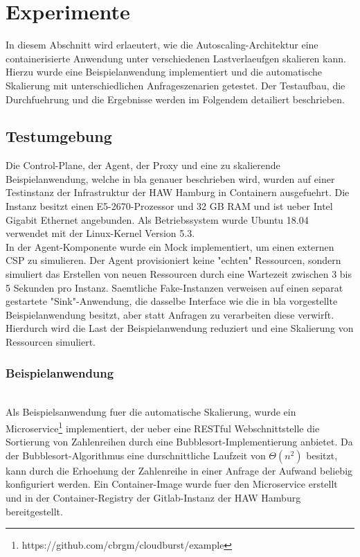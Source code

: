 \documentclass[runningheads]{llncs}
\begin{document}

\section{Experimente}

In diesem Abschnitt wird erlaeutert, wie die Autoscaling-Architektur eine containerisierte Anwendung unter verschiedenen Lastverlaeufgen skalieren kann. Hierzu wurde eine Beispielanwendung implementiert und die automatische Skalierung mit unterschiedlichen Anfrageszenarien getestet. Der Testaufbau, die Durchfuehrung und die Ergebnisse werden im Folgendem detailiert beschrieben.

\subsection{Testumgebung}

Die Control-Plane, der Agent, der Proxy und eine zu skalierende Beispielanwendung, welche in bla genauer beschrieben wird, wurden auf einer Testinstanz der Infrastruktur der HAW Hamburg in Containern ausgefuehrt. Die Instanz besitzt einen E5-2670-Prozessor und 32 GB RAM und ist ueber Intel Gigabit Ethernet angebunden. Als Betriebssystem wurde Ubuntu 18.04 verwendet mit der Linux-Kernel Version 5.3. \\

In der Agent-Komponente wurde ein Mock implementiert, um einen externen CSP zu simulieren. Der Agent provisioniert keine "echten" Ressourcen, sondern simuliert das Erstellen von neuen Ressourcen durch eine Wartezeit zwischen 3 bis 5 Sekunden pro Instanz. Saemtliche Fake-Instanzen verweisen auf einen separat gestartete "Sink"-Anwendung, die dasselbe Interface wie die in bla vorgestellte Beispielanwendung besitzt, aber statt Anfragen zu verarbeiten diese verwirft. Hierdurch wird die Last der Beispielanwendung reduziert und eine Skalierung von Ressourcen simuliert.

\subsubsection{Beispielanwendung} \hfill\\

Als Beispielsanwendung fuer die automatische Skalierung, wurde ein Microservice\footnote{https://github.com/cbrgm/cloudburst/example} implementiert, der ueber eine RESTful Webschnittstelle die Sortierung von Zahlenreihen durch eine Bubblesort-Implementierung anbietet. Da der Bubblesort-Algorithmus eine durschnittliche Laufzeit von $\Theta \left( n^{2}\right)$ besitzt, kann durch die Erhoehung der Zahlenreihe in einer Anfrage der Aufwand beliebig konfiguriert werden. Ein Container-Image wurde fuer den Microservice erstellt und in der Container-Registry der Gitlab-Instanz der HAW Hamburg bereitgestellt. \\
\end{document}
